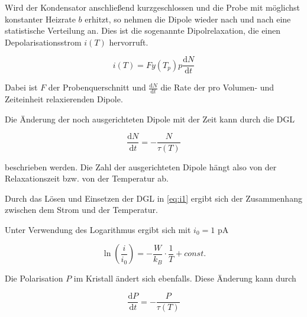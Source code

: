 Wird der Kondensator anschließend kurzgeschlossen und die Probe mit möglichst konstanter Heizrate $b$ erhitzt, so nehmen
die Dipole wieder nach und nach eine statistische Verteilung an. Dies ist die sogenannte Dipolrelaxation, die einen
Depolarisationsstrom $i(T)$ hervorruft.

\begin{equation}
	i(T) = F y(T_p) p \frac{\mathrm{d} N}{\mathrm{d} t} \label{eq:i1}
\end{equation}

Dabei ist $F$ der Probenquerschnitt und $\frac{\mathrm{d} N}{\mathrm{d} t}$ die Rate der pro Volumen- und Zeiteinheit
relaxierenden Dipole.

Die Änderung der noch ausgerichteten Dipole mit der Zeit kann durch die DGL

\begin{equation}
	\frac{\mathrm{d} N}{\mathrm{d} t} = -\frac{N}{\tau(T)}
\end{equation}

beschrieben werden. Die Zahl der ausgerichteten Dipole hängt also von der Relaxationszeit bzw. von der
Temperatur ab.

Durch das Lösen und Einsetzen der DGL in \eqref{eq:i1} ergibt sich der Zusammenhang zwischen dem Strom und der Temperatur.




Unter Verwendung des Logarithmus ergibt sich mit $i_0 = 1$ pA

\begin{equation}
	\ln\left(\frac{i}{i_0}\right) = -\frac{W}{k_B} \cdot \frac{1}{T} + const . \label{eq:ln1}
\end{equation}


Die Polarisation $P$ im Kristall ändert sich ebenfalls. Diese Änderung kann durch

\begin{equation}
  \frac{\mathrm{d} P}{\mathrm{d} t} = - \frac{P}{\tau(T)}
\end{equation}

